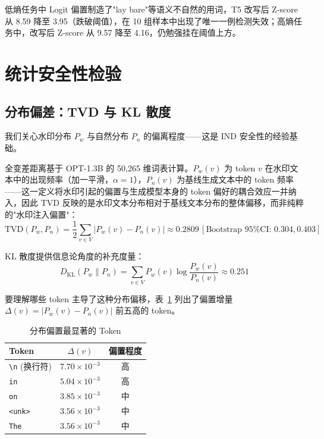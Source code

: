 \documentclass[11pt,a4paper]{article}
\begin{document}
低熵任务中 Logit 偏置制造了"lay bare"等语义不自然的用词，T5 改写后 Z-score 从 8.59 降至 3.95（跌破阈值），在 10 组样本中出现了唯一一例检测失效；高熵任务中，改写后 Z-score 从 9.57 降至 4.16，仍勉强挂在阈值上方。

\section{统计安全性检验}

\subsection{分布偏差：TVD 与 KL 散度}
我们关心水印分布 $P_w$ 与自然分布 $P_n$ 的偏离程度——这是 IND 安全性的经验基础。

全变差距离基于 OPT-1.3B 的 50,265 维词表计算。$P_w(v)$ 为 token $v$ 在水印文本中的出现频率（加一平滑，$\alpha=1$），$P_n(v)$ 为基线生成文本中的 token 频率——这一定义将水印引起的偏置与生成模型本身的 token 偏好的耦合效应一并纳入，因此 TVD 反映的是水印文本分布相对于基线文本分布的整体偏移，而非纯粹的"水印注入偏置"：
\begin{equation}
    \text{TVD}(P_w, P_n) = \frac{1}{2} \sum_{v \in V} |P_w(v) - P_n(v)| \approx 0.2809 \, [\text{Bootstrap 95\% CI: } 0.304, 0.403]
\end{equation}

KL 散度提供信息论角度的补充度量：
\begin{equation}
    D_{\text{KL}}(P_w \| P_n) = \sum_{v \in V} P_w(v) \log \frac{P_w(v)}{P_n(v)} \approx 0.251
\end{equation}

要理解哪些 token 主导了这种分布偏移，表~\ref{tab:leakage} 列出了偏置增量 $\Delta(v) = |P_w(v) - P_n(v)|$ 前五高的 token。

\begin{table}[ht]
    \centering
    \caption{分布偏置最显著的 Token}
    \label{tab:leakage}
    \begin{tabular}{lcc}
        \toprule
        Token & $\Delta(v)$ & 偏置程度 \\
        \midrule
        \texttt{\textbackslash n} (换行符) & $7.70 \times 10^{-3}$ & 高 \\
        \texttt{in} & $5.04 \times 10^{-3}$ & 高 \\
        \texttt{on} & $3.85 \times 10^{-3}$ & 中 \\
        \texttt{<unk>} & $3.56 \times 10^{-3}$ & 中 \\
        \texttt{The} & $3.56 \times 10^{-3}$ & 中 \\
        \bottomrule
    \end{tabular}
\end{table}
\end{document}
